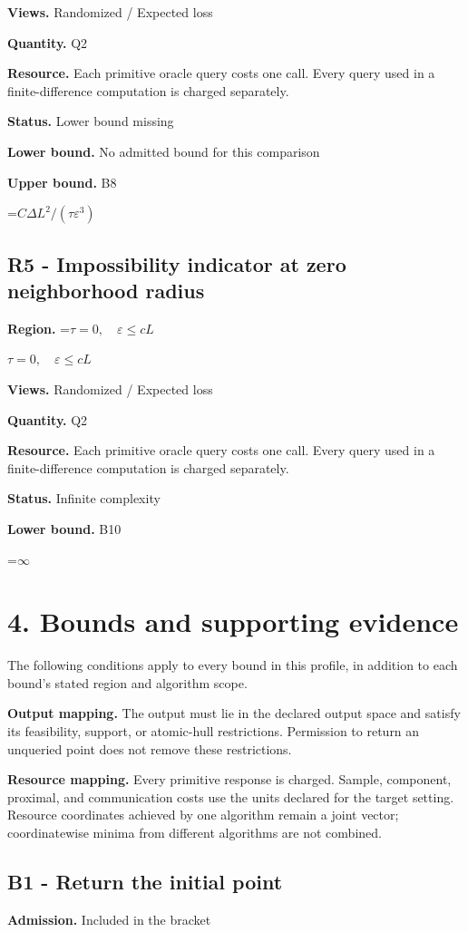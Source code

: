 \documentclass[10pt,a4paper]{article}
\newcommand{\AtlasMath}[1]{\par\begingroup\centering\setbox0=\hbox{$\displaystyle #1$}\ifdim\wd0>1.4\linewidth\typeout{ATLAS WIDE FORMULA: \the\wd0}\fi\ifdim\wd0>\linewidth\resizebox{\linewidth}{!}{\box0}\else\box0\fi\par\endgroup}
\newcommand{\AtlasInlineMath}[1]{\begingroup\setbox0=\hbox{$#1$}\ifdim\wd0>.4\linewidth\endgroup\AtlasMath{#1}\else\endgroup$#1$\fi}
\begin{document}
\textbf{Views.} Randomized / Expected loss

\textbf{Quantity.} Q2

\textbf{Resource.} Each primitive oracle query costs one call. Every query used in a finite-difference computation is charged separately.

\textbf{Status.} Lower bound missing

\textbf{Lower bound.} No admitted bound for this comparison

\textbf{Upper bound.} B8

\AtlasMath{C\Delta L^2/(\tau\varepsilon^3)}
\subsection{R5 - Impossibility indicator at zero neighborhood radius}
\textbf{Region.} \AtlasInlineMath{\tau=0,\quad\varepsilon\le cL}

\textbf{Views.} Randomized / Expected loss

\textbf{Quantity.} Q2

\textbf{Resource.} Each primitive oracle query costs one call. Every query used in a finite-difference computation is charged separately.

\textbf{Status.} Infinite complexity

\textbf{Lower bound.} B10

\AtlasMath{\infty}
\section{4. Bounds and supporting evidence}
The following conditions apply to every bound in this profile, in addition to each bound's stated region and algorithm scope.

\textbf{Output mapping.} The output must lie in the declared output space and satisfy its feasibility, support, or atomic-hull restrictions. Permission to return an unqueried point does not remove these restrictions.

\textbf{Resource mapping.} Every primitive response is charged. Sample, component, proximal, and communication costs use the units declared for the target setting. Resource coordinates achieved by one algorithm remain a joint vector; coordinatewise minima from different algorithms are not combined.

\subsection{B1 - Return the initial point}
\textbf{Admission.} Included in the bracket
\end{document}
